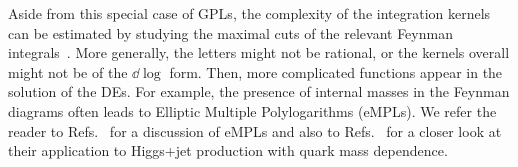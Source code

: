 \documentclass[main.tex]{subfiles}
\begin{document}
Aside from this special case of GPLs, the complexity of the integration kernels can be estimated by studying the maximal cuts of the relevant Feynman integrals~\cite{Tancredi:2017onthemaxcut, Abreu:2020jxa, abreu2021twoloop}. More generally, the letters might not be rational, or the kernels overall might not be of the $\dd \log$ form. Then, more complicated functions appear in the solution of the DEs.  For example, the presence of internal masses in the Feynman diagrams often leads to Elliptic Multiple Polylogarithms (eMPLs). We refer the reader to Refs.~\cite{Broedel:2017kkb, Broedel:2017siw, Adams:2017ejb, Broedel:2018qkq, Adams:2018yfj, Walden:2020odh} for a discussion of eMPLs and also to Refs.~\cite{Bonciani:2016qxi, Bonciani:2019jyb, Frellesvig:2019byn} for a closer look at their application to Higgs+jet production with quark mass dependence.
\end{document}
